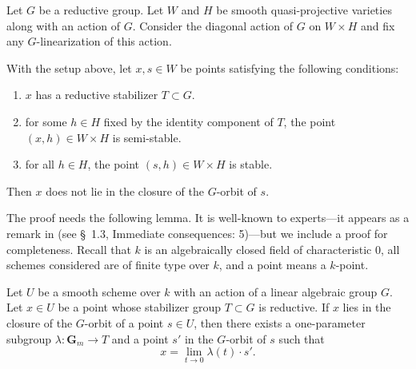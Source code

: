 \documentclass[12pt,reqno]{amsart}
\renewcommand{\k}{k}
\renewcommand{\to}{{\longrightarrow}}
\numberwithin{equation}{section}
\newcommand{\G}{\mathbf G}
\begin{document}
  Let $G$ be a reductive group.
  Let $W$ and $H$ be smooth quasi-projective varieties along with an action of $G$.
  Consider the diagonal action of $G$ on $W \times H$ and fix any $G$-linearization of this action.
\begin{proposition}\label{prop:gitproduct}
  With the setup above, let $x, s \in W$ be points satisfying the following conditions:
  \begin{enumerate}
  \item $x$ has a reductive stabilizer $T \subset G$.
  \item for some $h \in H$ fixed by the identity component of $T$, the point $(x, h) \in W \times H$ is semi-stable.
  \item for all $h \in H$, the point $(s, h) \in W \times H$ is stable.
  \end{enumerate}
  Then $x$ does not lie in the closure of the $G$-orbit of $s$.
\end{proposition}
The proof needs the following lemma.
It is well-known to experts---it appears as a remark in \cite{alp.hal.ryd:20} (see \S~1.3, Immediate consequences: 5)---but we include a proof for completeness.
Recall that $\k$ is an algebraically closed field of characteristic 0, all schemes considered are of finite type over $\k$, and a point means a $\k$-point.
\begin{lemma}\label{prop:oneparam}
  Let \(U\) be a smooth scheme over $\k$ with an action of a linear algebraic group $G$.
  Let $x \in U$ be a point whose stabilizer group $T \subset G$ is reductive.
  If $x$ lies in the closure of the $G$-orbit of a point $s \in U$, then there exists a one-parameter subgroup $\lambda \colon \G_m \to T$ and a point $s'$ in the $G$-orbit of $s$ such that
  \[ x = \lim_{t \to 0} \lambda(t) \cdot s'.\]
\end{lemma}
\end{document}

